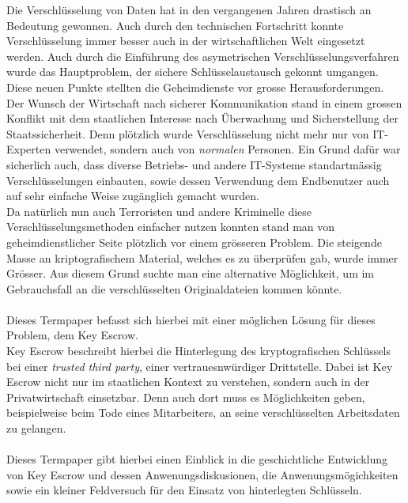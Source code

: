Die Verschlüsselung von Daten hat in den vergangenen Jahren drastisch an Bedeutung gewonnen. Auch durch den technischen Fortschritt konnte Verschlüsselung immer besser auch in der wirtschaftlichen Welt eingesetzt werden. Auch durch die Einführung des asymetrischen Verschlüsselungsverfahren wurde das Hauptproblem, der sichere Schlüsselaustausch gekonnt umgangen. \\
Diese neuen Punkte stellten die Geheimdienste vor grosse Herausforderungen. Der Wunsch der Wirtschaft nach sicherer Kommunikation stand in einem grossen Konflikt mit dem staatlichen Interesse nach Überwachung und Sicherstellung der Staatssicherheit. Denn plötzlich wurde Verschlüsselung nicht mehr nur von IT-Experten verwendet, sondern auch von \textit{normalen} Personen. Ein Grund dafür war sicherlich auch, dass diverse Betriebs- und andere IT-Systeme standartmässig Verschlüsselungen einbauten, sowie dessen Verwendung dem Endbenutzer auch auf sehr einfache Weise zugänglich gemacht wurden. \\
Da natürlich nun auch Terroristen und andere Kriminelle diese Verschlüsselungsmethoden einfacher nutzen konnten stand man von geheimdienstlicher Seite plötzlich vor einem grösseren Problem. Die steigende Masse an kriptografischem Material, welches es zu überprüfen gab, wurde immer Grösser. Aus diesem Grund suchte man eine alternative Möglichkeit, um im Gebrauchsfall an die verschlüsselten Originaldateien kommen könnte. \\
\\
Dieses Termpaper befasst sich hierbei mit einer möglichen Lösung für dieses Problem, dem Key Escrow.\\
Key Escrow beschreibt hierbei die Hinterlegung des kryptografischen Schlüssels bei einer \textit{trusted third party}, einer vertrauesnwürdiger Drittstelle. Dabei ist Key Escrow nicht nur im staatlichen Kontext zu verstehen, sondern auch in der Privatwirtschaft einsetzbar. Denn auch dort muss es Möglichkeiten geben, beispielweise beim Tode eines Mitarbeiters, an seine verschlüsselten Arbeitsdaten zu gelangen. \\
\\
Dieses Termpaper gibt hierbei einen Einblick in die geschichtliche Entwicklung von Key Escrow und dessen Anwenungsdiskusionen, die Anwenungsmögichkeiten sowie ein kleiner Feldversuch für den Einsatz von hinterlegten Schlüsseln.

